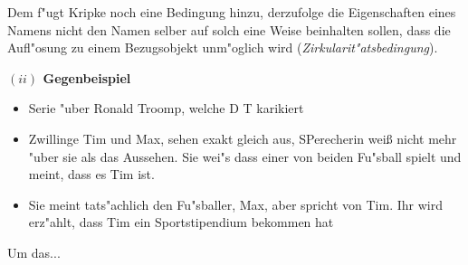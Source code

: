 \documentclass[a4paper, emulatestandardclasses, 12pt]{scrartcl}
\begin{document}
\begin{onehalfspace}
Dem f"ugt Kripke noch eine Bedingung hinzu, derzufolge die Eigenschaften eines Namens nicht den Namen selber auf solch eine Weise beinhalten sollen, dass die Aufl"osung zu einem Bezugsobjekt unm"oglich wird (\emph{Zirkularit"atsbedingung}).
\vspace{5mm}

\noindent\textbf{$(ii)$ Gegenbeispiel}	

\begin{itemize}
  \item Serie "uber Ronald Troomp, welche D T karikiert
  \item Zwillinge Tim und Max, sehen exakt gleich aus, SPerecherin weiß nicht mehr "uber sie als das Aussehen. Sie wei"s dass einer von beiden Fu"sball spielt und meint, dass es Tim ist. 
  \item Sie meint tats"achlich den Fu"sballer, Max, aber spricht von Tim. Ihr wird erz"ahlt, dass Tim ein Sportstipendium bekommen hat
\end{itemize}


\noindent Um das...


\end{onehalfspace}


\end{document}
